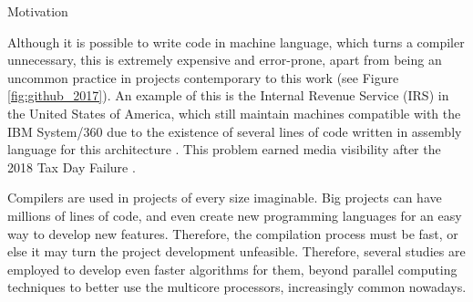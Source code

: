 \begin{section}{Motivation}

Although it is possible to write code in machine language, which turns a compiler
unnecessary, this is extremely expensive and error-prone, apart from being an
uncommon practice in projects contemporary to this work \citep{githuboctoverse}
(see Figure \ref{fig:github_2017}). An example of this is the Internal Revenue
Service (IRS) in the United States of America, which still maintain machines
compatible with the IBM System/360 due to the existence of several lines of
code written in assembly language for this architecture \citep{gao}.  This
problem earned media visibility after the  2018 Tax Day Failure
\citep{tax_failure}.


Compilers are used in projects of every size imaginable. Big projects can have
millions of lines of code, and even create new programming languages for an
easy way to develop new features. Therefore, the compilation process must be
fast, or else it may turn the project development unfeasible.  Therefore,
several studies are employed to develop even faster algorithms for them, beyond
parallel computing techniques to better use the multicore processors,
increasingly common nowadays.


\end{section}
